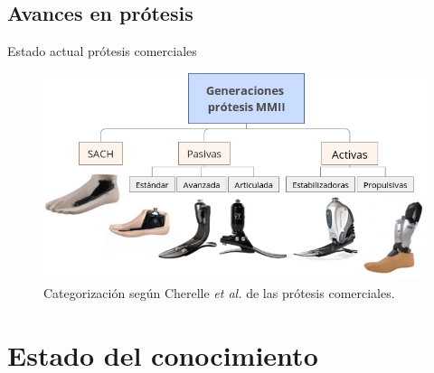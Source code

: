 \documentclass[10pt]{beamer}
\begin{document}
\subsection{Avances en prótesis}
\begin{frame}{Estado actual prótesis comerciales}

\begin{figure}
\begin{centering}
\includegraphics[scale=0.38]{Feathergraphics/Generacionesprotesis}
\par\end{centering}
\caption{{\footnotesize{}Categorización según Cherelle \emph{et al.} \cite{Cherelle2014a} de las
prótesis comerciales.} }

\end{figure}

\end{frame}


\section{Estado del conocimiento}
\end{document}

